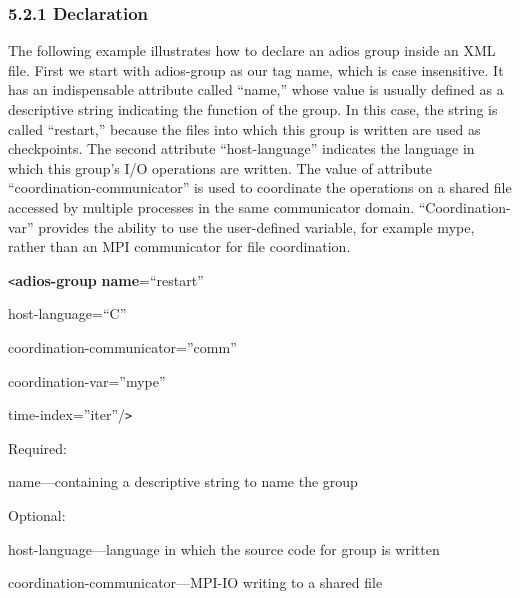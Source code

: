 \vspace{10pt}
\subsubsection*{{\large \textbf{5.2.1 Declaration}}}

\vspace{10pt}
The following example illustrates how to declare an adios group inside an XML file. 
First we start with adios-group as our tag name, which is case insensitive. It 
has an indispensable attribute called ``name,'' whose value is usually defined 
as a descriptive string indicating the function of the group. In this case, the 
string is called ``restart,'' because the files into which this group is written 
are used as checkpoints. The second attribute ``host-language'' indicates the language 
in which this group's I/O operations are written. The value of attribute ``coordination-communicator'' 
is used to coordinate the operations on a shared file accessed by multiple processes 
in the same communicator domain. ``Coordination-var'' provides the ability to use 
the user-defined variable, for example mype, rather than an MPI communicator for 
file coordination. 

\vspace{10pt}
\texttt{<}\textbf{adios-group} \textbf{name}=``restart'' 

\vspace{10pt}
\leftskip=72pt
host-language=``C''

\vspace{10pt}
coordination-communicator=''comm''

\vspace{10pt}
coordination-var=''mype''

\vspace{10pt}
time-index=''iter''/\texttt{>}

\vspace{10pt}
\leftskip=0pt
Required:

\vspace{10pt}
\leftskip=18pt
\parindent=3pt
name---containing a descriptive string to name the group

\vspace{10pt}
\leftskip=0pt
\parindent=0pt
Optional:

\vspace{10pt}
\leftskip=18pt
\parindent=3pt
host-language---language in which the source code for group is written

\vspace{10pt}
coordination-communicator---MPI-IO writing to a shared file

